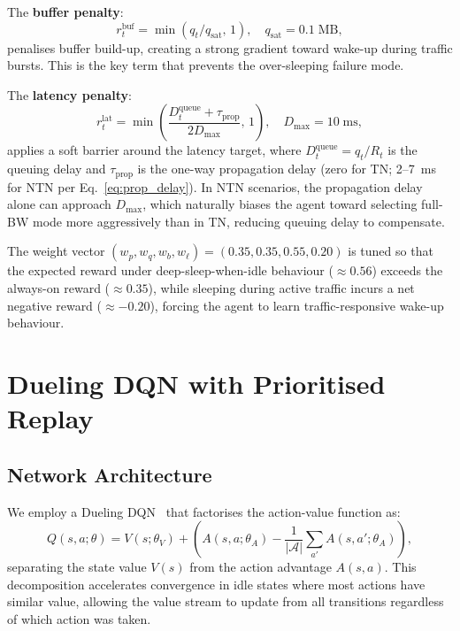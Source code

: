 \documentclass[conference]{IEEEtran}
\begin{document}
The \textbf{buffer penalty}:
\begin{equation}
  r_t^{\mathrm{buf}} = \min\!\left(q_t / q_{\mathrm{sat}},\, 1\right),
  \quad q_{\mathrm{sat}} = 0.1\;\mathrm{MB},
  \label{eq:r_buf}
\end{equation}
penalises buffer build-up, creating a strong gradient toward wake-up
during traffic bursts. This is the key term that prevents the
over-sleeping failure mode.

The \textbf{latency penalty}:
\begin{equation}
  r_t^{\mathrm{lat}} = \min\!\left(
    \frac{D_t^{\mathrm{queue}} + \tau_{\mathrm{prop}}}{2 D_{\mathrm{max}}},\, 1\right),
  \quad D_{\mathrm{max}} = 10\;\mathrm{ms},
  \label{eq:r_lat}
\end{equation}
applies a soft barrier around the latency target, where
$D_t^{\mathrm{queue}} = q_t / R_t$ is the queuing delay and
$\tau_{\mathrm{prop}}$ is the one-way propagation delay
(zero for TN; 2--7~ms for NTN per Eq.~\eqref{eq:prop_delay}).
In NTN scenarios, the propagation delay alone can approach $D_{\mathrm{max}}$,
which naturally biases the agent toward selecting full-BW mode more
aggressively than in TN, reducing queuing delay to compensate.

The weight vector $(w_p, w_q, w_b, w_\ell) = (0.35, 0.35, 0.55, 0.20)$
is tuned so that the expected reward under deep-sleep-when-idle
behaviour ($\approx 0.56$) exceeds the always-on reward ($\approx 0.35$),
while sleeping during active traffic incurs a net negative reward
($\approx -0.20$), forcing the agent to learn traffic-responsive
wake-up behaviour.

\section{Dueling DQN with Prioritised Replay}
\label{sec:algo}

\subsection{Network Architecture}

We employ a Dueling DQN~\cite{wang2016dueling} that factorises the
action-value function as:
\begin{equation}
  Q(s,a;\theta) = V(s;\theta_V)
    + \left(A(s,a;\theta_A)
      - \frac{1}{|\mathcal{A}|}\sum_{a'}A(s,a';\theta_A)\right),
  \label{eq:dueling}
\end{equation}
separating the state value $V(s)$ from the action advantage $A(s,a)$.
This decomposition accelerates convergence in idle states where most
actions have similar value, allowing the value stream to update from
all transitions regardless of which action was taken.
\end{document}
